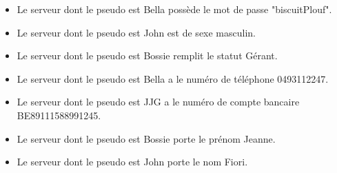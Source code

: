 \documentclass{article}
\begin{document}
\begin{itemize}
\item Le serveur dont le pseudo est Bella possède le mot de passe "biscuitPlouf".
\item Le serveur dont le pseudo est John est de sexe masculin. 
\item Le serveur dont le pseudo est Bossie remplit le statut Gérant.
\item Le serveur dont le pseudo est Bella a le numéro de téléphone 0493112247.
\item Le serveur dont le pseudo est JJG a le numéro de compte bancaire BE89111588991245.
\item Le serveur dont le pseudo est Bossie porte le prénom Jeanne. 
\item Le serveur dont le pseudo est John porte le nom Fiori.

\end{itemize}
\end{document}
